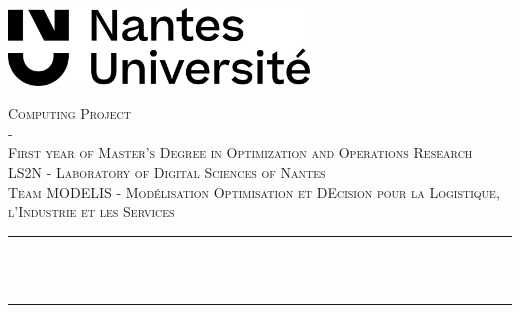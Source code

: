 \begin{titlepage}

\newcommand{\HRule}{\rule{\linewidth}{0.5mm}} %

\centering
\includegraphics[width=8cm]{logos/Logotype_Nantes-U_noir-300dpi.png}\\[1cm] %
 

\center %


\textsc{\LARGE Computing Project \\ - \\ First year of Master's Degree in Optimization and Operations Research}\\[1.5cm] 
\textsc{\Large LS2N - Laboratory of Digital Sciences of Nantes}\\[0.5cm] 
\textsc{\large Team MODELIS - Modélisation Optimisation et DEcision pour la Logistique, l'Industrie et les Services}\\[0.5cm] 

\makeatletter
\HRule \\[0.4cm]
{ \huge \bfseries \@title}\\[0.4cm] %
\HRule \\[1.5cm]
 


\end{titlepage}
